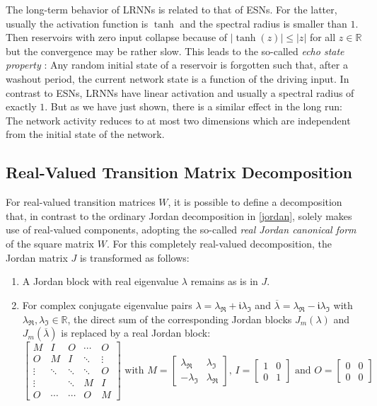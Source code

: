 \documentclass[twoside,11pt]{article}
\theoremstyle{definition}
\begin{document}
The long-term behavior of LRNNs is related to that of ESNs. For the latter,
usually the activation function is $\tanh$ and the spectral radius is smaller
than $1$. Then reservoirs with zero input collapse because of $|\!\tanh(z)| \le
|z|$ for all $z \in \mathbb{R}$ but the convergence may be rather slow. This leads
to the so-called \emph{echo state property} \citep{MJ13}: Any random initial
state of a reservoir is forgotten such that, after a washout period, the current
network state is a function of the driving input. In contrast to ESNs, LRNNs
have linear activation and usually a spectral radius of exactly $1$.
But as we have just shown, there is a similar effect in the long run: The
network activity reduces to at most two dimensions which are independent from
the initial state of the network.

\subsection{Real-Valued Transition Matrix Decomposition}\label{real}

For real-valued transition matrices $W$, it is possible to define a
decomposition that, in contrast to the ordinary Jordan decomposition in
\cref{jordan}, solely makes use of real-valued components, adopting the
so-called \emph{real Jordan canonical form} \cite[Sect.~3.4.1]{HJ13} of the
square matrix $W$.
For this completely real-valued decomposition, the Jordan matrix $J$ is
transformed as follows:
\begin{enumerate}
  \item A Jordan block with real eigenvalue $\lambda$ remains as is in $J$.
  \item For complex conjugate eigenvalue pairs $\lambda = \lambda_\Re +
	\mathfrak{i}\lambda_\Im$ and $\overline{\lambda} = \lambda_\Re - \mathfrak{i}\lambda_\Im$
	with $\lambda_\Re,\lambda_\Im \in \mathbb{R}$, the
	direct sum of the corresponding Jordan blocks $J_m(\lambda)$ and
	$J_m(\overline{\lambda})$ is replaced by a real Jordan block:
	\[
	  \left[ \begin{array}{*{5}{c}}
		M & I & O & \cdots & O\\
		O & M & I & \ddots & \vdots\\
		\vdots & \ddots & \ddots & \ddots & O\\
		\vdots & & \ddots & M & I\\
		O & \cdots & \cdots & O & M
	  \end{array} \right]
	  \textrm{~with~}
	  M = \left[ \begin{array}{cc}
		\lambda_\Re & \lambda_\Im\\
		-\lambda_\Im & \lambda_\Re
	  \end{array} \right]
	  \!\textrm{, }
	  I = \left[ \begin{array}{cc}
		1 & 0\\
		0 & 1
	  \end{array} \right]
	  \textrm{ and }
	  O = \left[ \begin{array}{cc}
		0 & 0\\
		0 & 0
	  \end{array} \right]
	\]
\end{enumerate}
\end{document}
